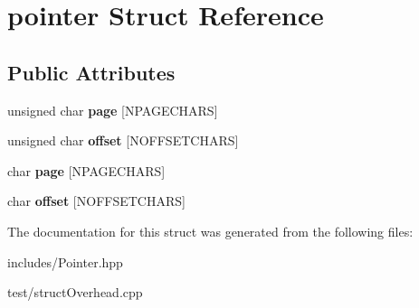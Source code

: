 \hypertarget{structpointer}{}\section{pointer Struct Reference}
\label{structpointer}
\subsection*{Public Attributes}
\begin{DoxyCompactItemize}
\item 
\mbox{\label{structpointer_ab87c49e9530aac6ca6e774e4f9e4ee79}} 
unsigned char {\bfseries page} \mbox{[}N\+P\+A\+G\+E\+C\+H\+A\+RS\mbox{]}
\item 
\mbox{\label{structpointer_a10d309201f42a88b3ea6ae824cf29c06}} 
unsigned char {\bfseries offset} \mbox{[}N\+O\+F\+F\+S\+E\+T\+C\+H\+A\+RS\mbox{]}
\item 
\mbox{\label{structpointer_a6b99504e0c08397e28c749f87ae69984}} 
char {\bfseries page} \mbox{[}N\+P\+A\+G\+E\+C\+H\+A\+RS\mbox{]}
\item 
\mbox{\label{structpointer_acb55bc4d12e4f0ae766eeda780abc7d6}} 
char {\bfseries offset} \mbox{[}N\+O\+F\+F\+S\+E\+T\+C\+H\+A\+RS\mbox{]}
\end{DoxyCompactItemize}


The documentation for this struct was generated from the following files\+:\begin{DoxyCompactItemize}
\item 
includes/Pointer.\+hpp\item 
test/struct\+Overhead.\+cpp\end{DoxyCompactItemize}
